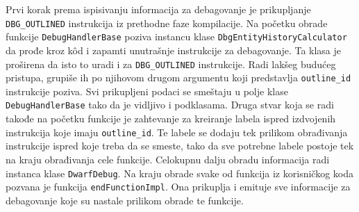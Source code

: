 \documentclass[12pt,oneside]{memoir}
\begin{document}
Prvi korak prema ispisivanju informacija za debagovanje je prikupljanje \verb|DBG_OUTLINED| instrukcija iz prethodne faze kompilacije.
Na početku obrade funkcije \verb|DebugHandlerBase| poziva instancu klase \verb|DbgEntityHistoryCalculator| da prođe kroz k\^od i zapamti unutrašnje instrukcije za debagovanje.
Ta klasa je proširena da isto to uradi i za \verb|DBG_OUTLINED| instrukcije.
Radi lakšeg budućeg pristupa, grupiše ih po njihovom drugom argumentu koji predstavlja \verb|outline_id| instrukcije poziva. %
Svi prikupljeni podaci se smeštaju u polje klase \verb|DebugHandlerBase| tako da je vidljivo i podklasama.
Druga stvar koja se radi takođe na početku funkcije je zahtevanje za kreiranje labela ispred izdvojenih instrukcija koje imaju \verb|outline_id|.
Te labele se dodaju tek prilikom obrađivanja instrukcije ispred koje treba da se smeste, tako da sve potrebne labele postoje tek na kraju obrađivanja cele funkcije.
Celokupnu dalju obradu informacija radi instanca klase \verb|DwarfDebug|.
Na kraju obrade svake od funkcija iz korisničkog koda pozvana je funkcija \verb|endFunctionImpl|.
Ona prikuplja i emituje sve informacije za debagovanje koje su nastale prilikom obrade te funkcije.
\end{document}
